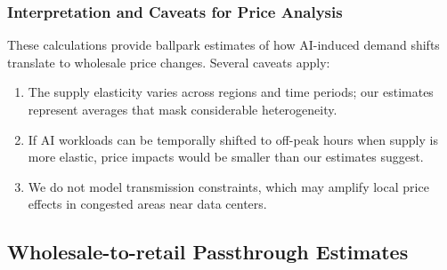 \documentclass[sigconf]{acmart}
\begin{document}
\subsubsection{Interpretation and Caveats for Price Analysis}\label{appendix:Caveats}

These calculations provide ballpark estimates of how AI-induced demand shifts translate to wholesale price changes. Several caveats apply:
\begin{enumerate}
    \item The supply elasticity varies across regions and time periods; our estimates represent averages that mask considerable heterogeneity.
    \item If AI workloads can be temporally shifted to off-peak hours when supply is more elastic, price impacts would be smaller than our estimates suggest.
    \item We do not model transmission constraints, which may amplify local price effects in congested areas near data centers.
\end{enumerate}

\subsection{Wholesale-to-retail Passthrough Estimates}\label{WholesaleRetailPassthrough}
\end{document}

